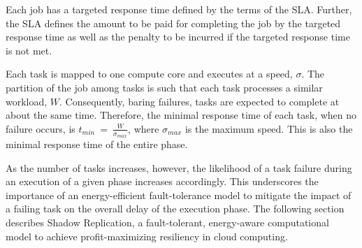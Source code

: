 Each job has a targeted response time defined
by the terms of the SLA. Further, the SLA defines the amount to be
paid for completing the job by the targeted response time as well as
the penalty to be incurred if the targeted response time is not
met. 

Each task is mapped to one compute core and executes at a speed, $\sigma$. The partition of the job among tasks is
such that each task processes a similar
workload, $W$. Consequently, baring failures, tasks are expected to
complete at about the same time. Therefore, the minimal response time
of each task, when no failure occurs, is
$t_{min}~=~\frac{W}{\sigma_{max}}$, where $\sigma_{max}$ is the maximum speed. This is also the minimal response
time of the entire phase. 

As the number of tasks increases, however, the likelihood of a task
failure during an execution of a given phase increases
accordingly. This underscores the importance of an energy-efficient
fault-tolerance model to mitigate the impact of a failing task on the
overall delay of the execution phase. The following section describes
Shadow Replication, a fault-tolerant, energy-aware computational model to achieve profit-maximizing resiliency in cloud computing.
